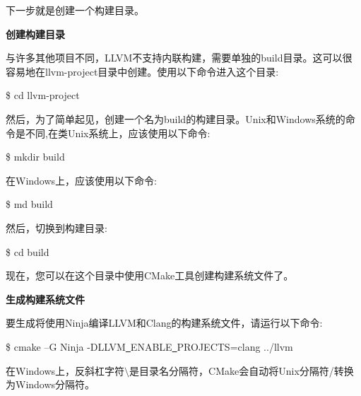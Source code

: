 下一步就是创建一个构建目录。\par

\hspace*{\fill} \par %
\textbf{创建构建目录}

与许多其他项目不同，LLVM不支持内联构建，需要单独的build目录。这可以很容易地在llvm-project目录中创建。使用以下命令进入这个目录:\par

\begin{tcolorbox}[colback=white,colframe=black]
	\$ cd llvm-project
\end{tcolorbox}

然后，为了简单起见，创建一个名为build的构建目录。Unix和Windows系统的命令是不同,在类Unix系统上，应该使用以下命令:\par

\begin{tcolorbox}[colback=white,colframe=black]
	\$ mkdir build
\end{tcolorbox}

在Windows上，应该使用以下命令:\par

\begin{tcolorbox}[colback=white,colframe=black]
	\$ md build
\end{tcolorbox}

然后，切换到构建目录:\par

\begin{tcolorbox}[colback=white,colframe=black]
	\$ cd build
\end{tcolorbox}

现在，您可以在这个目录中使用CMake工具创建构建系统文件了。\par

\hspace*{\fill} \par %
\textbf{生成构建系统文件}

要生成将使用Ninja编译LLVM和Clang的构建系统文件，请运行以下命令:\par

\begin{tcolorbox}[colback=white,colframe=black]
	\$ cmake –G Ninja -DLLVM\underline{~}ENABLE\underline{~}PROJECTS=clang ../llvm
\end{tcolorbox}

\begin{tcolorbox}[colback=blue!5!white,colframe=blue!75!black,title=Tip]
	在Windows上，反斜杠字符$\setminus$是目录名分隔符，CMake会自动将Unix分隔符/转换为Windows分隔符。
\end{tcolorbox}

